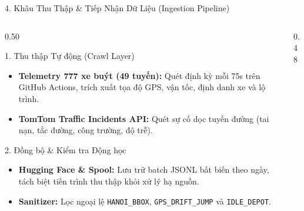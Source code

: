 \documentclass[aspectratio=169,10pt]{beamer}
\begin{document}
\begin{frame}{4. Khâu Thu Thập \& Tiếp Nhận Dữ Liệu (Ingestion Pipeline)}
\begin{columns}[T]
    \begin{column}{0.50\textwidth}
        \begin{block}{1. Thu thập Tự động (Crawl Layer)}
            \begin{itemize}\setlength{\itemsep}{2pt}\footnotesize
                \item \textbf{Telemetry 777 xe buýt (49 tuyến):} Quét định kỳ mỗi 75s trên GitHub Actions, trích xuất tọa độ GPS, vận tốc, định danh xe và lộ trình.
                \item \textbf{TomTom Traffic Incidents API:} Quét sự cố dọc tuyến đường (tai nạn, tắc đường, công trường, độ trễ).
            \end{itemize}
        \end{block}
        \vspace{2pt}
        \begin{block}{2. Đồng bộ \& Kiểm tra Động học}
            \begin{itemize}\setlength{\itemsep}{2pt}\footnotesize
                \item \textbf{Hugging Face \& Spool:} Lưu trữ batch JSONL bất biến theo ngày, tách biệt tiến trình thu thập khỏi xử lý hạ nguồn.
                \item \textbf{Sanitizer:} Lọc ngoại lệ \texttt{HANOI\_BBOX}, \texttt{GPS\_DRIFT\_JUMP} và \texttt{IDLE\_DEPOT}.
            \end{itemize}
        \end{block}
    \end{column}

    \begin{column}{0.48\textwidth}
        \centering
\end{column}
\end{columns}
\end{frame}
\end{document}

